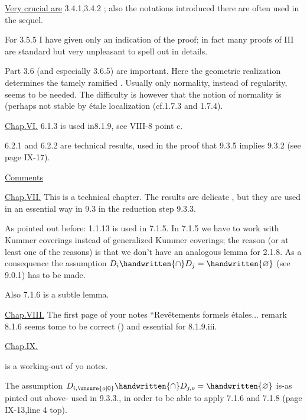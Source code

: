 \uline{Very crucial are}  3.4.1,3.4.2 ; also the notations introduced there are often used in the sequel.

For 3.5.5 I have given only an indication of the proof; in fact many proofs of III are standard but very unpleasant to spell out in  details.

Part 3.6 (and especially 3.6.5) are important. Here the geometric realization determines the tamely ramified . Usually only normality, instead of regularity, seems to be needed. The difficulty is however that the notion of normality is (perhaps not stable by étale localization (cf.1.7.3 and 1.7.4).

\uline{Chap.VI.}  6.1.3 is used in8.1.9, see VIII-8 point c.

6.2.1 and 6.2.2 are technical results, used in the proof that 9.3.5 implies 9.3.2 (see  page IX-17).


\uline{Comments}

\uline{Chap.VII.} This is a technical chapter. The results are delicate , but they are used in an essential way in 9.3 in the reduction step 9.3.3.

As pointed out before: 1.1.13 is used in 7.1.5. In 7.1.5 we have to work with Kummer coverings instead of generalized Kummer coverings; the reason (or at least one of the reasons) is that we don't have an analogous lemma for 2.1.8. As a consequence the assumption $D_i\handwritten{\cap}D_j=\handwritten{\varnothing}$ (see 9.0.1) has to be made.

Also 7.1.6 is a subtle lemma.

\uline{Chap.VIII.} The first page of your notes ``Revêtements formels étales... remark 8.1.6 seems tome to be correct (\handwritten{!}) and essential for 8.1.9.iii.

\uline{Chap.IX.}

 is a working-out of yo notes.

The assumption $D_{i,\unsure{o|0}}\handwritten{\cap}D_{j,o}=\handwritten{\varnothing}$ is-as pinted out above- used in 9.3.3., in order to be able to apply 7.1.6 and 7.1.8 (page IX-13,line 4 top).

